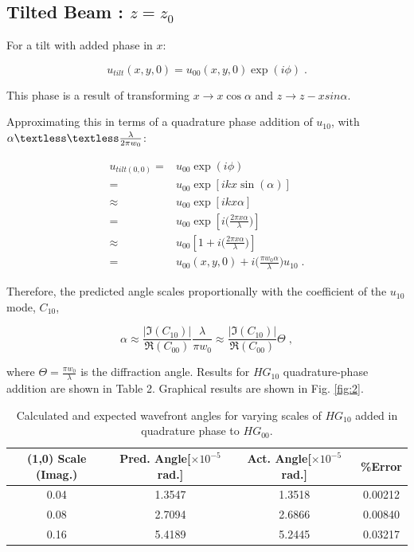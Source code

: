 \documentclass[aps,twoside,secnumarabic,balancelastpage,amsmath,amssymb,nofootinbib,hyperref=pdftex]{revtex4}
\newcommand{\bigfrac}[2]{\Big( \frac{#1}{#2}\Big)}
\begin{document}
\subsection{Tilted Beam : $z=z_0$}	
For a tilt with added phase in $x$:
	
	\begin{equation} \label{eq:11}
		u_{tilt}(x,y,0)=u_{00}(x,y,0) \exp(i\phi)\;.
	\end{equation}

This phase is a result of transforming $x \rightarrow x \cos \alpha$ and $z \rightarrow z - x sin \alpha$.

	Approximating this in terms of a quadrature phase addition of $u_{10}$, with $\alpha \textless\textless \frac{\lambda}{2\pi w_{0}}$:
	
	
	\begin{align}\label{eq:12}
		u_{tilt (0,0)} 
			=& u_{00} \exp(i \phi)
		\nonumber\\	
			= & u_{00} \exp \left[ikx \sin(\alpha) \right] 
		\nonumber\\	
			\approx & u_{00} \exp \left[ ikx\alpha \right]
		\nonumber\\
			= & u_{00} \exp \left[ i \bigfrac{2 \pi x \alpha}{\lambda} \right]
		\nonumber\\ 
			\approx & u_{00} \left[
			1 + i \bigfrac{2 \pi x \alpha}{\lambda} \right]
			\nonumber\\
			= & u_{00}(x,y,0) + i  \bigfrac{\pi w_{0} \alpha}{\lambda}u_{10} \; .
	\end{align}
	
Therefore, the predicted angle scales proportionally with the coefficient of the $u_{10}$ mode, $C_{10}$,

	\begin{equation}
    	\alpha \approx \frac{|\Im(C_{10})|}{\Re(C_{00})}\frac{ \lambda}{\pi w_{0} } \approx \frac{|\Im(C_{10})|}{\Re(C_{00})}\Theta \; ,
	\end{equation}
	
where $\Theta = \frac{\pi w_{0}}{\lambda}$ is the diffraction angle. Results for $HG_{10}$ quadrature-phase addition are shown in Table 2. Graphical results are shown in Fig. \ref{fig:2}.

	\begin{center}
	\begin{table}[ht]\label{tab:2}
	 \begin{tabular}{||c c c c||} 
	 \hline
	 (1,0) Scale (Imag.) & Pred. Angle[$\times 10^{-5}$ rad.] & Act. Angle[$\times 10^{-5}$ rad.] & \%Error \\ [0.5ex] 
	 \hline\hline
	 0.04 & 1.3547 & 1.3518 & 0.00212 \\ 
	 \hline
	 0.08 & 2.7094 & 2.6866 & 0.00840 \\
	 \hline
	 0.16 & 5.4189  & 5.2445 & 0.03217 \\ [1ex]
	 \hline
	\end{tabular}
	\caption{Calculated and expected wavefront angles for varying scales of $HG_{10}$ added in quadrature phase to $HG_{00}$.}
	\end{table}
	\end{center}
\end{document}
